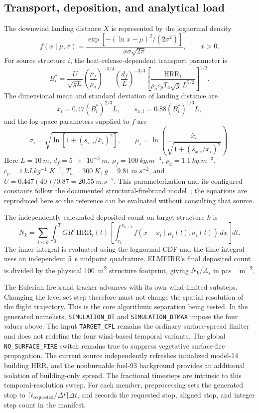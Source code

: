 \subsection{Transport, deposition, and analytical load}

The downwind landing distance \(X\) is represented by the lognormal density
\[
 f(x\mid\mu,\sigma)=
 \frac{\exp[-(\ln x-\mu)^2/(2\sigma^2)]}
      {x\sigma\sqrt{2\pi}},\qquad x>0.
\]
For source structure \(i\), the heat-release-dependent transport parameter is
\[
 B_i^*=\frac{U}{\sqrt{gL}}
 \left(\frac{\rho_f}{\rho_a}\right)^{-3/4}
 \left(\frac{d_f}{L}\right)^{-3/4}
 \left[
 \frac{\mathrm{HRR}_i}
 {\rho_a c_p T_a\sqrt{g}\,L^{5/2}}
 \right]^{1/2}.
\]
The dimensional mean and standard deviation of landing distance are
\[
 \bar x_i=0.47(B_i^*)^{2/3}L,\qquad
 s_{x,i}=0.88(B_i^*)^{1/3}L,
\]
and the log-space parameters supplied to \(f\) are
\[
 \sigma_i=\sqrt{\ln\!\left[1+(s_{x,i}/\bar x_i)^2\right]},
 \qquad
 \mu_i=\ln\!\left(
 \frac{\bar x_i}{\sqrt{1+(s_{x,i}/\bar x_i)^2}}
 \right).
\]
Here \(L=\SI{10}{m}\), \(d_f=\SI{5e-3}{m}\),
\(\rho_f=\SI{100}{kg.m^{-3}}\), \(\rho_a=\SI{1.1}{kg.m^{-3}}\),
\(c_p=\SI{1}{kJ.kg^{-1}.K^{-1}}\), \(T_a=\SI{300}{K}\),
\(g=\SI{9.81}{m.s^{-2}}\), and
\(U=0.447(40)/0.87=\SI{20.55}{m.s^{-1}}\). This parameterization and its
configured constants follow the documented structural-firebrand
model~\cite{Qin2025}; the equations are reproduced here so the reference can
be evaluated without consulting that source.

The independently calculated deposited count on target structure \(k\) is
\[
N_k=\sum_{i<k}\int_0^T GR'\,\mathrm{HRR}_i(t)
\left[\int_{x_k}^{x_{k+1}}
 f\!\left(x-x_i\mid\mu_i(t),\sigma_i(t)\right)\,dx\right]dt .
\]
The inner integral is evaluated using the lognormal CDF and the time integral
uses an independent \SI{5}{s} midpoint quadrature. ELMFIRE's final deposited
count is divided by the physical \SI{100}{m^2} structure footprint, giving
\(N_k/A_s\) in \si{pcs\,m^{-2}}.

The Eulerian firebrand tracker advances with its own wind-limited substeps.
Changing the level-set step therefore must not change the spatial resolution of
the flight trajectory. This is the core algorithmic separation being tested.
In the generated namelists, \texttt{SIMULATION\_DT} and
\texttt{SIMULATION\_DTMAX} impose the four values above. The input
\texttt{TARGET\_CFL} remains the ordinary surface-spread limiter and does not
redefine the four wind-based temporal variants.  The global \texttt{NO\_SURFACE\_FIRE} switch remains true to suppress vegetative surface-fire propagation.  The current source independently refreshes initialized model-14 building HRR, and the nonburnable fuel-93 background provides an additional isolation of building-only spread.
The fractional timesteps are intrinsic to this temporal-resolution sweep.  For
each member, preprocessing sets the generated stop to
\(\lceil t_{\mathrm{requested}}/\Delta t\rceil\Delta t\), and records the
requested stop, aligned stop, and integer step count in the manifest.

